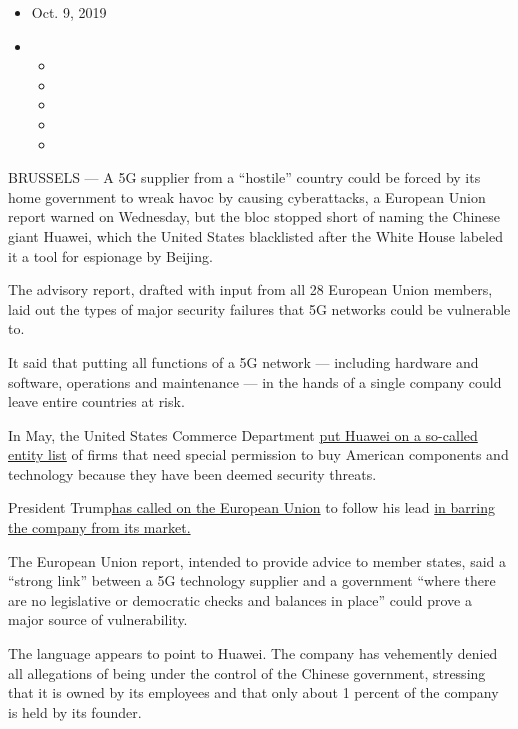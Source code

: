 \begin{itemize}
\item
  Oct. 9, 2019
\item
  \begin{itemize}
  \item
  \item
  \item
  \item
  \item
  \end{itemize}
\end{itemize}

BRUSSELS --- A 5G supplier from a ``hostile'' country could be forced by
its home government to wreak havoc by causing cyberattacks, a European
Union report warned on Wednesday, but the bloc stopped short of naming
the Chinese giant Huawei, which the United States blacklisted after the
White House labeled it a tool for espionage by Beijing.

The advisory report, drafted with input from all 28 European Union
members, laid out the types of major security failures that 5G networks
could be vulnerable to.

It said that putting all functions of a 5G network --- including
hardware and software, operations and maintenance --- in the hands of a
single company could leave entire countries at risk.

In May, the United States Commerce Department
\href{https://www.nytimes.com/2019/05/16/technology/huawei-ban-president-trump.html}{put
Huawei on a so-called entity list} of firms that need special permission
to buy American components and technology because they have been deemed
security threats.

President
Trump\href{https://www.nytimes.com/2019/01/26/us/politics/huawei-china-us-5g-technology.html}{has
called on the European Union} to follow his lead
\href{https://www.nytimes.com/2019/05/15/business/huawei-ban-trump.html?module=inline}{in
barring the company from its market.}

The European Union report, intended to provide advice to member states,
said a ``strong link'' between a 5G technology supplier and a government
``where there are no legislative or democratic checks and balances in
place'' could prove a major source of vulnerability.

The language appears to point to Huawei. The company has vehemently
denied all allegations of being under the control of the Chinese
government, stressing that it is owned by its employees and that only
about 1 percent of the company is held by its founder.

